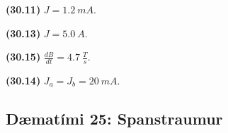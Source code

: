 \ifdefined \wholebook \else\documentclass[oneside]{book}\usepackage{EdlBook}\graphicspath{{figures/}}
\begin{document}
\begin{tcolorbox}
\begin{enumerate*}[label = ]
  \item \textbf{(30.11)} $J = \SI{1.2}{mA}$.
  \item \textbf{(30.13)} $J = \SI{5.0}{A}$.
  \item \textbf{(30.15)} $\frac{dB}{dt} = \SI{4.7}{\frac{T}{s}}$.
  \item \textbf{(30.14)} $J_a = J_b = \SI{20}{mA}$.
\end{enumerate*}
\end{tcolorbox}


\newpage

\subsection*{Dæmatími 25: Spanstraumur}
\end{document}
